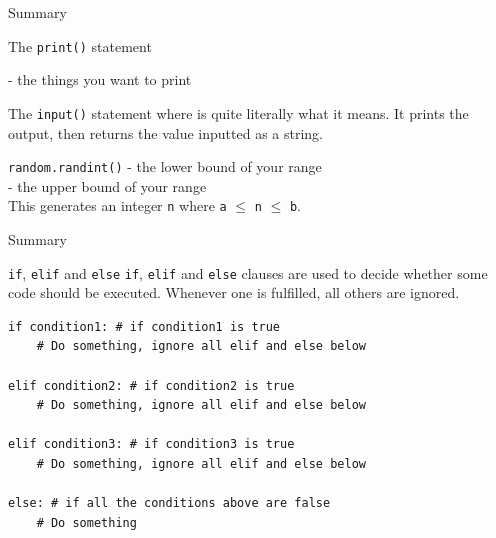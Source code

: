 \documentclass[dvipsnames, svgnames, x11names]{beamer}
\begin{document}
\begin{frame}[fragile]{Summary}
\begin{block}{The \texttt{print()} statement}

 - the things you want to print
\end{block}

\begin{block}{The \texttt{input()} statement}
where  is quite literally what it means. It prints the output, then returns the value inputted as a string.
\end{block}
\begin{block}{\texttt{random.randint()}}
 - the lower bound of your range\\[1pt]
 - the upper bound of your range\\
This generates an integer \texttt{n} where \texttt{a} $\leq$ \texttt{n} $\leq$ \texttt{b}.
\end{block}
\end{frame}

\begin{frame}[fragile]{Summary}
\begin{block}{\texttt{if}, \texttt{elif} and \texttt{else}}
\texttt{if}, \texttt{elif} and \texttt{else} clauses are used to decide whether some code should be executed.
Whenever one is fulfilled, all others are ignored.
\begin{verbatim}
if condition1: # if condition1 is true
    # Do something, ignore all elif and else below

elif condition2: # if condition2 is true
    # Do something, ignore all elif and else below

elif condition3: # if condition3 is true
    # Do something, ignore all elif and else below

else: # if all the conditions above are false
    # Do something
\end{verbatim}
\end{block}
\end{frame}
\end{document}
